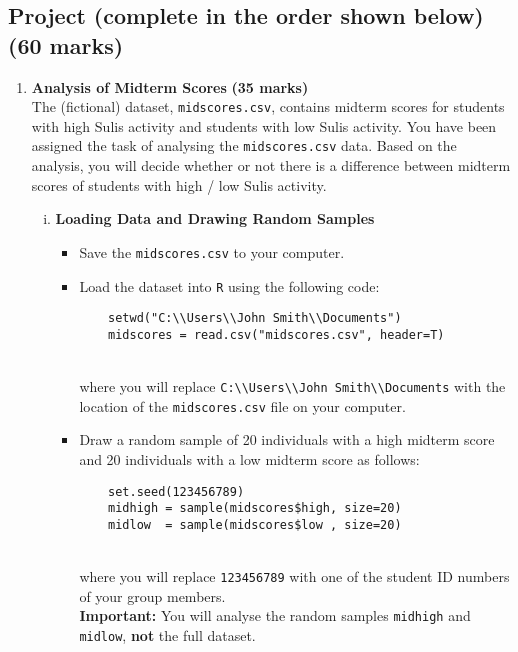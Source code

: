\documentclass[12pt]{article}
\begin{document}
\subsection*{Project {\normalsize(complete in the order shown below)}\hfill{\scriptsize \bf (60 marks)}}
\begin{enumerate}[1)]
\item {\bf Analysis of Midterm Scores} \hfill{\scriptsize \bf (35 marks)} \\
The (fictional) dataset, \texttt{midscores.csv}, contains midterm scores for students with high Sulis activity and students with low Sulis activity. You have been assigned the task of analysing the \texttt{midscores.csv}  data. Based on the analysis, you will decide whether or not there is a difference between midterm scores of students with high / low  Sulis activity.
\begin{enumerate}[i)]
\item {\bf Loading Data and Drawing Random Samples}
\begin{itemize}
\item Save the \texttt{midscores.csv} to your computer.
\item Load the dataset into \texttt{R} using the following code:
    \begin{verbatim}
    setwd("C:\\Users\\John Smith\\Documents")
    midscores = read.csv("midscores.csv", header=T)
    \end{verbatim}
    \noindent\\[-1cm]
    where you will replace \verb"C:\\Users\\John Smith\\Documents" with the location of the \texttt{midscores.csv} file on your computer.
\item Draw a random sample of 20 individuals with a high midterm score and 20 individuals with a low midterm score as follows:
    \begin{verbatim}
    set.seed(123456789)
    midhigh = sample(midscores$high, size=20)
    midlow  = sample(midscores$low , size=20)
    \end{verbatim}
    \noindent\\[-1cm]
    where you will replace \texttt{123456789} with one of the student ID numbers of your group members.\\[0.3cm] {\bf Important:} You will analyse the random samples \texttt{midhigh} and \texttt{midlow}, {\bf not} the full dataset.

\end{itemize}
\end{enumerate}
\end{enumerate}
\end{document}

